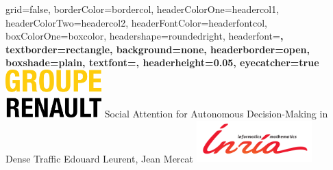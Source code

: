 \documentclass[a0paper,portrait,fontscale=0.3, margin=2cm]{baposter}
\begin{document}
\begin{poster}{
grid=false,
borderColor=bordercol, %
headerColorOne=headercol1, %
headerColorTwo=headercol2, %
headerFontColor=headerfontcol, %
boxColorOne=boxcolor, %
headershape=roundedright, %
headerfont=\Large\bf\textsc, %
textborder=rectangle,
background=none,
headerborder=open, %
boxshade=plain,
textfont={\setlength{\parindent}{0.0em}\sffamily},
headerheight={0.05\textheight},
eyecatcher=true
}
%
%
{
\includegraphics[width=10em]{./img/companies}
}
{
Social Attention for Autonomous Decision-Making in Dense Traffic
}
{
Edouard Leurent, Jean Mercat
\vspace{-4\baselineskip}
}
{
\includegraphics[width=12em]{./img/inria_sc}
}

\setlength{\colheight}{0.92\textheight}


\end{poster}
\end{document}
